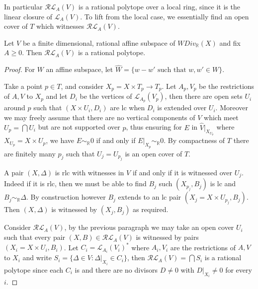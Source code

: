 \documentclass[a4paper,12pt]{amsart}
\begin{document}
	
	In particular $\mathcal{RL}_{A}(V)$ is a rational polytope over a local ring, since it is the linear closure of $\mathcal{L}_{A}(V)$. To lift from the local case, we essentially find an open cover of $T$ which witnesses $\mathcal{RL}_{A}(V)$.
	
	\begin{theorem}\label{rlt-poly}
		Let $V$ be a finite dimensional, rational affine subspace of $WDiv_{\mathbb{R}}(X)$ and fix $A \geq 0$. Then $\mathcal{RL}_{A}(V)$ is a rational polytope.
	\end{theorem}
	
	\begin{proof}
		For $W$ an affine subspace, let $\hat{W}=\{w-w' \text{ such that } w,w' \in W\}$.
		
		Take a point $p \in T$, and consider $X_{p}=X\times T_{p} \to T_{p}$. Let $A_{p},V_{p}$ be the restrictions of $A,V$ to $X_{p}$ and let $D_{i}$ be the vertices of $\mathcal{L}_{A_{p}}(V_{p})$, then there are open sets $U_{i}$ around $p$ such that $(X\times U_{i},D_{i})$ are lc when $D_{i}$ is extended over $U_{i}$. Moreover we may freely assume that there are no vertical components of $V$ which meet $U_{p}= \bigcap U_{i}$ but are not supported over $p$, thus ensuring for $E$ in $\hat{V}|_{X_{U_{p}}}$ where $X_{U_{p}}=X\times U_{p}$, we have $E \sim_{\mathbb{R}} 0$ if and only if $E|_{X_{p}}\sim_{\mathbb{R}} 0$. By compactness of $T$ there are finitely many $p_{j}$ such that $U_{j}=U_{p_{j}}$ is an open cover of $T$. 
		
		A pair $(X,\Delta)$ is rlc with witnesses in $V$ if and only if it is witnessed over $U_{j}$. Indeed if it is rlc, then we must be able to find $B_{j}$ such $(X_{p_{j}},B_{j})$ is lc and $B_{j} \sim_{\mathbb{R}} \Delta$. By construction however $B_{j}$ extends to an lc pair $(X_{j}=X\times U_{p_{j}},B_{j})$. Then $(X,\Delta)$ is witnessed by $(X_{j}, B_{j})$ as required.
		
		Consider $\mathcal{RL}_{A}(V)$, by the previous paragraph we may take an open cover $U_{i}$ such that every pair $(X,B) \in \mathcal{RL}_{A}(V)$ is witnessed by pairs $(X_{i}=X\times U_{i},B_{i})$. Let $C_{i} = \mathcal{L}_{A_{i}}(V_{i})^{*}$ where $A_{i}, V_{i}$ are the restrictions of $A,V$ to $X_{i}$ and write $S_{i}=\{\Delta \in V: \Delta|_{X_{i}} \in C_{i}\}$, then $\mathcal{RL}_{A}(V)= \bigcap S_{i}$ is a rational polytope since each $C_{i}$ is and there are no divisors $D \neq 0$ with $D|_{X_{i}} \neq 0$ for every $i$.
	\end{proof}
	
\end{document}
